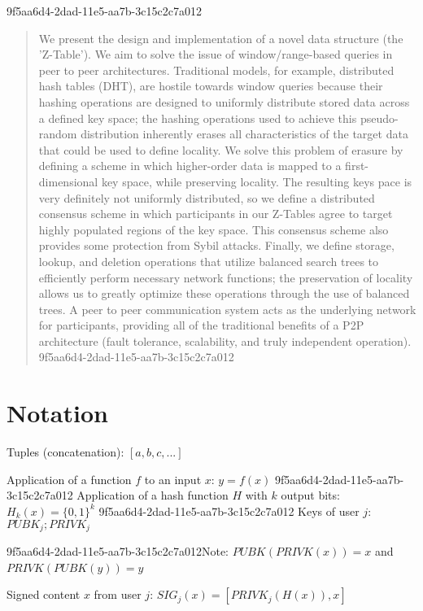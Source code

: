 \documentclass[12pt]{article}
\begin{document}
\maketitle
9f5aa6d4-2dad-11e5-aa7b-3c15c2c7a012
\begin{abstract}
We present the design and implementation of a novel data structure (the 'Z-Table'). We aim to solve the issue of window/range-based queries in peer to peer architectures. Traditional models, for example,  distributed hash tables (DHT), are hostile towards window queries because their hashing operations are designed to uniformly distribute stored data across a defined key space; the hashing operations used to achieve this pseudo-random distribution inherently erases all characteristics of the target data that could be used to define locality. We solve this problem of erasure by defining a scheme in which higher-order data is mapped to a first-dimensional key space, while preserving locality. The resulting keys pace is very definitely not uniformly distributed, so we define a distributed consensus scheme in which participants in our Z-Tables agree to target highly populated regions of the key space. This consensus scheme also provides some protection from Sybil attacks. Finally, we define storage, lookup, and deletion operations that utilize balanced search trees to efficiently perform necessary network functions; the preservation of locality allows us to greatly optimize these operations through the use of balanced trees. A peer to peer communication system acts as the underlying network for participants, providing all of the traditional benefits of a P2P architecture (fault tolerance, scalability, and truly independent operation).
9f5aa6d4-2dad-11e5-aa7b-3c15c2c7a012\end{abstract}

\section{Notation}

Tuples (concatenation): $[a,b,c,...]$

Application of a function $f$ to an input $x$: $y=f(x)$
9f5aa6d4-2dad-11e5-aa7b-3c15c2c7a012
Application of a hash function $H$ with $k$ output bits: $H_{k}(x) = \{0,1\}^k$
9f5aa6d4-2dad-11e5-aa7b-3c15c2c7a012
Keys of user $j$: $ PUBK_j; PRIVK_j $

9f5aa6d4-2dad-11e5-aa7b-3c15c2c7a012Note: $PUBK(PRIVK(x)) = x$ and $PRIVK(PUBK(y)) = y$~

Signed content $x$ from user $j$: $SIG_j(x) = \left[ PRIVK_j( H(x) ), x \right]$
\end{document}
